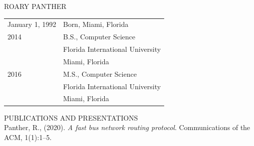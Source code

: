 \begin{center}
ROARY PANTHER \\[4ex]
\end{center}

\noindent
\begin{tabular}{ll}
January 1, 1992 & Born, Miami, Florida \\[2ex]

2014 \hspace{2in} & B.S., Computer Science \\
	        & Florida International University \\
		& Miami, Florida \\[2ex]
              
2016            & M.S., Computer Science \\
               & Florida International University \\
		& Miami, Florida \\[2ex]

\end{tabular}

\noindent
PUBLICATIONS AND PRESENTATIONS \\[2ex]

\noindent
Panther, R., (2020). {\em A fast bus network routing protocol}.
Communications of the ACM, 1(1):1--5. \\[2ex]


